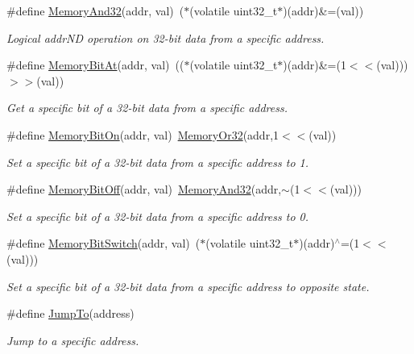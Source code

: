 \begin{DoxyCompactItemize}
\#define \mbox{\hyperlink{a00020_ad87cedffcaadc51db22594fce55173d4}{Memory\+And32}}(addr,  val)~($\ast$(volatile uint32\+\_\+t$\ast$)(addr)\&=(val))
\begin{DoxyCompactList}\small\item\em Logical addr\+ND operation on 32-\/bit data from a specific address. \end{DoxyCompactList}\item 
\#define \mbox{\hyperlink{a00020_afc530c7e6b49b0ca97c1ad9dac1c4750}{Memory\+Bit\+At}}(addr,  val)~(($\ast$(volatile uint32\+\_\+t$\ast$)(addr)\&=(1$<$$<$(val)))$>$$>$(val))
\begin{DoxyCompactList}\small\item\em Get a specific bit of a 32-\/bit data from a specific address. \end{DoxyCompactList}\item 
\#define \mbox{\hyperlink{a00020_a99a602346038b54068758ef00c42d1b6}{Memory\+Bit\+On}}(addr,  val)~\mbox{\hyperlink{a00020_a27874a97deab7cecdde5ddecf466e31e}{Memory\+Or32}}(addr,1$<$$<$(val))
\begin{DoxyCompactList}\small\item\em Set a specific bit of a 32-\/bit data from a specific address to 1. \end{DoxyCompactList}\item 
\#define \mbox{\hyperlink{a00020_a04c34919a950117ae7da2dc5a235622b}{Memory\+Bit\+Off}}(addr,  val)~\mbox{\hyperlink{a00020_ad87cedffcaadc51db22594fce55173d4}{Memory\+And32}}(addr,$\sim$(1$<$$<$(val)))
\begin{DoxyCompactList}\small\item\em Set a specific bit of a 32-\/bit data from a specific address to 0. \end{DoxyCompactList}\item 
\#define \mbox{\hyperlink{a00020_ae49e41753dbce64185d380d307ade78d}{Memory\+Bit\+Switch}}(addr,  val)~($\ast$(volatile uint32\+\_\+t$\ast$)(addr)$^\wedge$=(1$<$$<$(val)))
\begin{DoxyCompactList}\small\item\em Set a specific bit of a 32-\/bit data from a specific address to opposite state. \end{DoxyCompactList}\item 
\#define \mbox{\hyperlink{a00020_a38c3a81fc94bff4cb6654061b7d21909}{Jump\+To}}(address)
\begin{DoxyCompactList}\small\item\em Jump to a specific address. \end{DoxyCompactList}\item 
$$
\end{DoxyCompactItemize}
